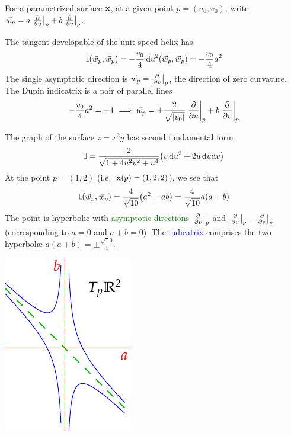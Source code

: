 \begin{examples}{}{}
For a parametrized surface ${\mathbf{x}}$, at a given point $p=(u_0,v_0)$, write $\vec w_p=a\left.\frac{\partial }{\partial u}\right|_{p}+b\left.\frac{\partial }{\partial v}\right|_{p}$.
\begin{enumerate}
  \item The tangent developable of the unit speed helix has
	\[\mathbb{I}(\vec w_p,\vec w_p)=-\frac{v_0}4\,{\mathrm{d} u}^2(\vec w_p,\vec w_p)=-\frac{v_0}4a^2\]
	The single asymptotic direction is $\vec w_p=\smash{\left.\frac{\partial }{\partial v}\right|_{p}}$, the direction of zero curvature. The Dupin indicatrix is a pair of parallel lines
	\[-\frac{v_0}4a^2=\pm 1\implies \vec w_p=\pm\frac 2{\sqrt{\left| v_0\right|}}\left.\frac{\partial }{\partial u}\right|_{p}+b\left.\frac{\partial }{\partial v}\right|_{p}\]
	
\begin{minipage}[t]{0.75\linewidth}\vspace{0pt}
	\item The graph of the surface $z=x^2y$ has second fundamental form
	\[\mathbb{I}=\frac{2}{\sqrt{1+4u^2v^2+u^4}}\bigl(v\,{\mathrm{d} u}^2+2u\,{\mathrm{d} u}{\mathrm{d} v}\bigr)
	\]
	At the point $p=(1,2)$ (i.e.\ ${\mathbf{x}}(p)=(1,2,2)$), we see that
	\[\mathbb{I}(\vec w_p,\vec w_p)=\frac 4{\sqrt{10}}\bigl(a^2+ab\bigr)=\frac 4{\sqrt{10}}a(a+b)\]
	The point is hyperbolic with \textcolor{Green}{asymptotic directions} $\left.\frac{\partial }{\partial v}\right|_{p}$ and $\left.\frac{\partial }{\partial u}\right|_{p}-\left.\frac{\partial }{\partial v}\right|_{p}$ (corresponding to $a=0$ and $a+b=0$). The \textcolor{blue}{indicatrix} comprises the two hyperbolæ $a(a+b)=\pm\frac{\sqrt 10}4$.
\end{minipage}\hfill\begin{minipage}[t]{0.24\linewidth}\vspace{0pt}
	\flushright\includegraphics{euler-indicatrix}
\end{minipage}
\end{enumerate}
\end{examples}


